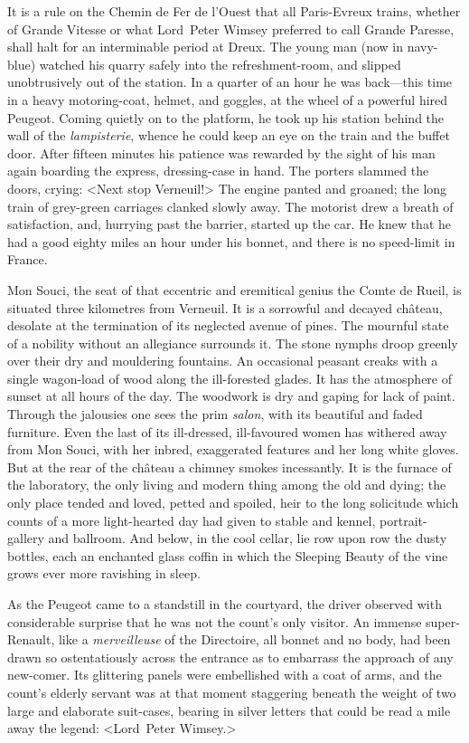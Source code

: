 \divider
It is a rule on the Chemin de Fer de l'Ouest that all Paris-Evreux trains, whether of Grande Vitesse or what Lord~Peter Wimsey preferred to call Grande Paresse, shall halt for an interminable period at Dreux. The young man (now in navy-blue) watched his quarry safely into the refreshment-room, and slipped unobtrusively out of the station. In a quarter of an hour he was back—this time in a heavy motoring-coat, helmet, and goggles, at the wheel of a powerful hired Peugeot. Coming quietly on to the platform, he took up his station behind the wall of the \textit{lampisterie}, whence he could keep an eye on the train and the buffet door. After fifteen minutes his patience was rewarded by the sight of his man again boarding the express, dressing-case in hand. The porters slammed the doors, crying: <Next stop Verneuil!> The engine panted and groaned; the long train of grey-green carriages clanked slowly away. The motorist drew a breath of satisfaction, and, hurrying past the barrier, started up the car. He knew that he had a good eighty miles an hour under his bonnet, and there is no speed-limit in France.

\divider
Mon Souci, the seat of that eccentric and eremitical genius the Comte de Rueil, is situated three kilometres from Verneuil. It is a sorrowful and decayed château, desolate at the termination of its neglected avenue of pines. The mournful state of a nobility without an allegiance surrounds it. The stone nymphs droop greenly over their dry and mouldering fountains. An occasional peasant creaks with a single wagon-load of wood along the ill-forested glades. It has the atmosphere of sunset at all hours of the day. The woodwork is dry and gaping for lack of paint. Through the jalousies one sees the prim \textit{salon}, with its beautiful and faded furniture. Even the last of its ill-dressed, ill-favoured women has withered away from Mon Souci, with her inbred, exaggerated features and her long white gloves. But at the rear of the château a chimney smokes incessantly. It is the furnace of the laboratory, the only living and modern thing among the old and dying; the only place tended and loved, petted and spoiled, heir to the long solicitude which counts of a more light-hearted day had given to stable and kennel, portrait-gallery and ballroom. And below, in the cool cellar, lie row upon row the dusty bottles, each an enchanted glass coffin in which the Sleeping Beauty of the vine grows ever more ravishing in sleep.

As the Peugeot came to a standstill in the courtyard, the driver observed with considerable surprise that he was not the count's only visitor. An immense super-Renault, like a \textit{merveilleuse} of the Directoire, all bonnet and no body, had been drawn so ostentatiously across the entrance as to embarrass the approach of any new-comer. Its glittering panels were embellished with a coat of arms, and the count's elderly servant was at that moment staggering beneath the weight of two large and elaborate suit-cases, bearing in silver letters that could be read a mile away the legend: <Lord~Peter Wimsey.>

